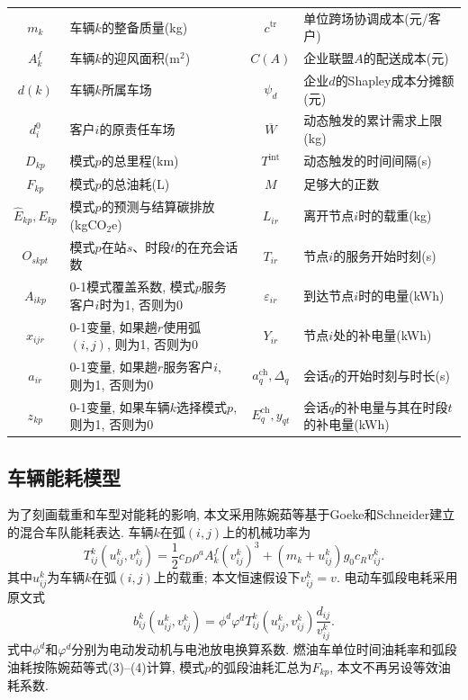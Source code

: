\documentclass{setp-new}
\begin{document}
\begin{table}[H]
\begin{tabular*}{\linewidth}{@{\extracolsep{\fill}}cJcJ@{}}
$m_k$ & 车辆$k$的整备质量(kg) & $c^{\mathrm{tr}}$ & 单位跨场协调成本(元/客户)\\
$A_k^f$ & 车辆$k$的迎风面积(m$^2$) & $C(A)$ & 企业联盟$A$的配送成本(元)\\
$d(k)$ & 车辆$k$所属车场 & $\psi_d$ & 企业$d$的Shapley成本分摊额(元)\\
$d_i^0$ & 客户$i$的原责任车场 & $\overline W$ & 动态触发的累计需求上限(kg)\\
$D_{kp}$ & 模式$p$的总里程(km) & $T^{\mathrm{int}}$ & 动态触发的时间间隔(s)\\
$F_{kp}$ & 模式$p$的总油耗(L) & $M$ & 足够大的正数\\
$\widehat E_{kp},E_{kp}$ & 模式$p$的预测与结算碳排放(kgCO$_2$e) & $L_{ir}$ & 离开节点$i$时的载重(kg)\\
$O_{skpt}$ & 模式$p$在站$s$、时段$t$的在充会话数 & $T_{ir}$ & 节点$i$的服务开始时刻(s)\\
$A_{ikp}$ & 0-1模式覆盖系数, 模式$p$服务客户$i$时为1, 否则为0 & $\varepsilon_{ir}$ & 到达节点$i$时的电量(kWh)\\
$x_{ijr}$ & 0-1变量, 如果趟$r$使用弧$(i,j)$, 则为1, 否则为0 & $Y_{ir}$ & 节点$i$处的补电量(kWh)\\
$a_{ir}$ & 0-1变量, 如果趟$r$服务客户$i$, 则为1, 否则为0 & $a_q^{\mathrm{ch}},\Delta_q$ & 会话$q$的开始时刻与时长(s)\\
$z_{kp}$ & 0-1变量, 如果车辆$k$选择模式$p$, 则为1, 否则为0 & $E_q^{\mathrm{ch}},y_{qt}$ & 会话$q$的补电量与其在时段$t$的补电量(kWh)\\
\bottomrule
\end{tabular*}
\end{table}

\subsection{车辆能耗模型}

为了刻画载重和车型对能耗的影响,
本文采用陈婉茹等\cite{ref:23}基于Goeke和Schneider\cite{ref:27}建立的混合车队能耗表达.
车辆$k$在弧$(i,j)$上的机械功率为
\begin{equation}
T_{ij}^k(u_{ij}^k,v_{ij}^k)=\frac12c_D\rho^a A_k^f (v_{ij}^k)^3
+(m_k+u_{ij}^k)g_0c_Rv_{ij}^k.
\label{eq:power}
\end{equation}
其中$u_{ij}^k$为车辆$k$在弧$(i,j)$上的载重; 本文恒速假设下$v_{ij}^k=v$.
电动车弧段电耗采用原文式
\begin{equation}
b_{ij}^k(u_{ij}^k,v_{ij}^k)=\phi^d\varphi^dT_{ij}^k(u_{ij}^k,v_{ij}^k)
\frac{d_{ij}}{v_{ij}^k}.
\label{eq:electricity}
\end{equation}
式中$\phi^d$和$\varphi^d$分别为电动发动机与电池放电换算系数.
燃油车单位时间油耗率和弧段油耗按陈婉茹等\cite{ref:23}式(3)--(4)计算,
模式$p$的弧段油耗汇总为$F_{kp}$, 本文不再另设等效油耗系数.
\end{document}
